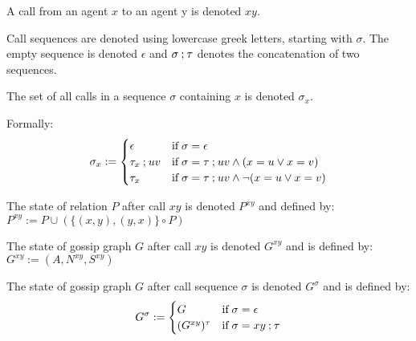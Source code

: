 \begin{definition}[Calls]
    \label{def:calls}
    A call from an agent \(x\) to an agent y is denoted \(xy\).

    \begin{subdefinition}
        \label{def:call-sequence}
        Call sequences are denoted using lowercase greek letters, starting with \(\sigma\). The empty sequence is denoted \(\epsilon\) and \(\sigma \mathbin{;} \tau\) denotes the concatenation of two sequences.
    \end{subdefinition}
    
    \begin{subdefinition}[Subsequence]
        The set of all calls in a sequence \(\sigma\) containing \(x\) is denoted \(\sigma_x\).

        Formally:
        \[
            \sigma_x := 
            \begin{cases} 
                \epsilon            & \text{if}\; \sigma = \epsilon\\
                \tau_x\mathbin{;}uv & \text{if}\; \sigma = \tau \mathbin{;} uv \land (x = u \lor x = v) \\ 
                \tau_x              & \text{if}\; \sigma = \tau \mathbin{;} uv \land \lnot(x = u \lor x = v) 
            \end{cases}
        \]
    \end{subdefinition}

    \begin{subdefinition}
        \label{def:call-effect-relation}
        The state of relation \(P\) after call \(xy\) is denoted \(P^{xy}\) and defined by: \( P^{xy} := P \cup (\{(x,y),(y,x)\} \circ P) \)
    \end{subdefinition}

    \begin{subdefinition}
        \label{def:call-effect-graph}
        The state of gossip graph \(G\) after call \(xy\) is denoted \(G^{xy}\) and is defined by: \( G^{xy} := (A,N^{xy},S^{xy}) \)
    \end{subdefinition}

    \begin{subdefinition}
        The state of gossip graph \(G\) after call sequence \(\sigma\) is denoted \(G^\sigma\) and is defined by:
        \[ 
            G^\sigma := 
            \begin{cases}
                G               & \text{if}\; \sigma = \epsilon\\
                (G^{xy})^\tau   & \text{if}\; \sigma = xy \mathbin{;} \tau
            \end{cases}
        \]
    \end{subdefinition}


\end{definition}
